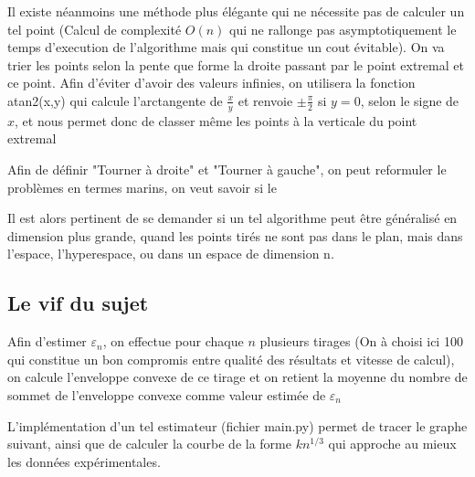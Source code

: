 \documentclass[a4paper,12pt,twoside]{article}
\begin{document}
		Il existe néanmoins une méthode plus élégante qui ne nécessite pas de calculer un tel point (Calcul de complexité $O(n)$ qui ne rallonge pas asymptotiquement le temps d'execution de l'algorithme mais qui constitue un cout évitable). On va trier les points selon la pente que forme la droite passant par le point extremal et ce point. Afin d'éviter d'avoir des valeurs infinies, on utilisera la fonction atan2(x,y) qui calcule l'arctangente de $\frac{x}{y}$ et renvoie $\pm \frac{\pi}{2}$ si $y = 0$, selon le signe de $x$, et nous permet donc de classer même les points à la verticale du point extremal

		Afin de définir "Tourner à droite" et "Tourner à gauche", on peut reformuler le problèmes en termes marins, on veut savoir si le 

		Il est alors pertinent de se demander si un tel algorithme peut être généralisé en dimension plus grande, quand les points tirés ne sont pas dans le plan, mais dans l'espace, l'hyperespace, ou dans un espace de dimension n.



	\subsection{Le vif du sujet}
		Afin d'estimer $\varepsilon_n$, on effectue pour chaque $n$ plusieurs tirages (On à choisi ici 100 qui constitue un bon compromis entre qualité des résultats et vitesse de calcul), on calcule l'enveloppe convexe de ce tirage et on retient la moyenne du nombre de sommet de l'enveloppe convexe comme valeur estimée de $\varepsilon_n$

		L'implémentation d'un tel estimateur (fichier main.py) permet de tracer le graphe suivant, ainsi que de calculer la courbe de la forme $kn^{1/3}$ qui approche au mieux les données expérimentales.

		
\end{document}
